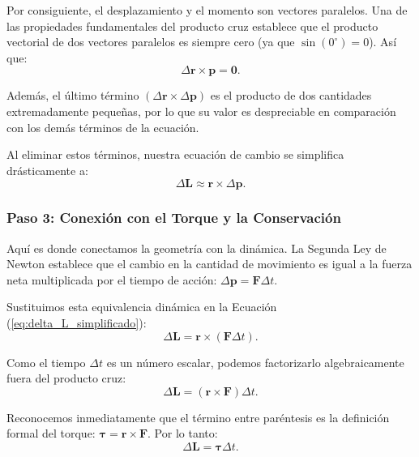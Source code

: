 \documentclass[11pt,a4paper]{book}
\begin{document}
Por consiguiente, el desplazamiento y el momento son vectores paralelos. Una de las propiedades fundamentales del producto cruz establece que el producto vectorial de dos vectores paralelos es siempre cero (ya que $\sin(0^\circ) = 0$). Así que:
\begin{equation}
    \Delta\boldsymbol{r} \times \boldsymbol{p} = \boldsymbol{0}.
\end{equation}

Además, el último término $(\Delta\boldsymbol{r} \times \Delta\boldsymbol{p})$ es el producto de dos cantidades extremadamente pequeñas, por lo que su valor es despreciable en comparación con los demás términos de la ecuación. 

Al eliminar estos términos, nuestra ecuación de cambio se simplifica drásticamente a:
\begin{equation}
    \Delta \boldsymbol{L} \approx \boldsymbol{r} \times \Delta\boldsymbol{p}.
    \label{eq:delta_L_simplificado}
\end{equation}

\subsubsection{Paso 3: Conexión con el Torque y la Conservación}

Aquí es donde conectamos la geometría con la dinámica. La Segunda Ley de Newton establece que el cambio en la cantidad de movimiento es igual a la fuerza neta multiplicada por el tiempo de acción: $\Delta\boldsymbol{p} = \boldsymbol{F} \Delta t$.

Sustituimos esta equivalencia dinámica en la Ecuación (\ref{eq:delta_L_simplificado}):
\begin{equation}
    \Delta \boldsymbol{L} = \boldsymbol{r} \times (\boldsymbol{F} \Delta t).
\end{equation}

Como el tiempo $\Delta t$ es un número escalar, podemos factorizarlo algebraicamente fuera del producto cruz:
\begin{equation}
    \Delta \boldsymbol{L} = (\boldsymbol{r} \times \boldsymbol{F}) \Delta t.
\end{equation}

Reconocemos inmediatamente que el término entre paréntesis es la definición formal del torque: $\boldsymbol{\tau} = \boldsymbol{r} \times \boldsymbol{F}$. Por lo tanto:
\begin{equation}
    \Delta \boldsymbol{L} = \boldsymbol{\tau} \Delta t.
\end{equation}
\end{document}
